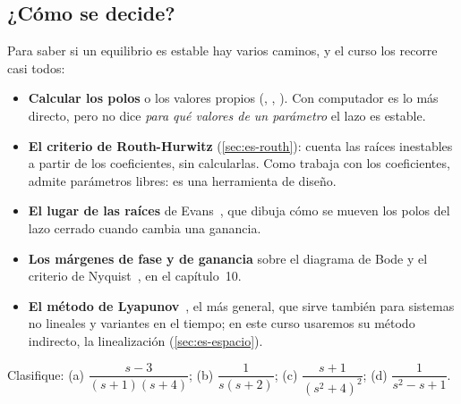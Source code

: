 
\subsection*{¿Cómo se decide?}

Para saber si un equilibrio es estable hay varios caminos, y el curso los recorre casi todos:
\begin{itemize}
  \item \textbf{Calcular los polos} o los valores propios (, , ). Con computador es lo más directo, pero no dice \emph{para qué valores de un parámetro} el lazo es estable.
  \item \textbf{El criterio de Routh-Hurwitz} (\cref{sec:es-routh}): cuenta las raíces inestables a partir de los coeficientes, sin calcularlas. Como trabaja con los coeficientes, admite parámetros libres: es una herramienta de diseño.
  \item \textbf{El lugar de las raíces} de Evans~\citep{Eva50}, que dibuja cómo se mueven los polos del lazo cerrado cuando cambia una ganancia.
  \item \textbf{Los márgenes de fase y de ganancia} sobre el diagrama de Bode y el criterio de Nyquist~\citep{Nyq32,Bod40}, en el capítulo~10.
  \item \textbf{El método de Lyapunov}~\citep{Lya92}, el más general, que sirve también para sistemas no lineales y variantes en el tiempo; en este curso usaremos su método indirecto, la linealización (\cref{sec:es-espacio}).
\end{itemize}

\begin{pausa}
Clasifique: (a) $\dfrac{s-3}{(s+1)(s+4)}$; (b) $\dfrac{1}{s(s+2)}$; (c) $\dfrac{s+1}{(s^2+4)^2}$; (d) $\dfrac{1}{s^2-s+1}$.
\end{pausa}
